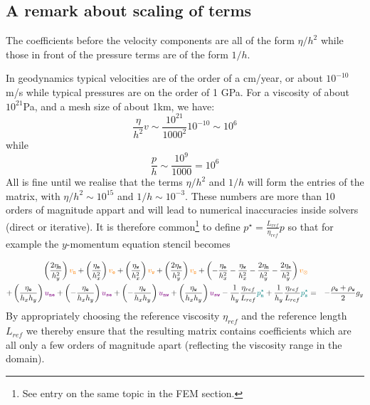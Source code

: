 \subsection{A remark about scaling of terms}

The coefficients before the velocity components are all of the form 
$\eta/h^2$ while those in front of the pressure terms are of the form 
$1/h$. 

In geodynamics typical velocities are of the order of a cm/year, or about 
$10^{-10}$ m/s
while typical pressures are on the order of 1 GPa.
For a viscosity of about $10^{21}$Pa, and a mesh size of about 1km, 
we have:
\[
\frac{\eta}{h^2} v \sim \frac{10^{21}}{1000^2} 10^{-10} \sim 10^6
\]
while
\[
\frac{p}{h} \sim \frac{10^9}{1000} = 10^6
\]
All is fine until we realise that the terms $\eta/h^2$ and $1/h$ 
will form the entries of the matrix, with 
$\eta/h^2 \sim 10^{15}$ and $1/h \sim 10^{-3}$. 
These numbers are more than 10 orders of magnitude appart and will lead to 
numerical inaccuracies inside solvers (direct or iterative). 
It is therefore common\footnote{See entry on the same topic
in the FEM section.} to define ${p}^\star=\frac{L_{ref}}{\eta_{ref}} p$ so that 
for example the $y$-momentum equation stencil becomes


\begin{eqnarray}
\left( \frac{2\eta_{\tt n}}{h_y^2} \right) {\color{orange} v_{\tt n}} +
\left( \frac{ \eta_{\tt e}}{h_x^2} \right) {\color{orange} v_{\tt e}} +
\left( \frac{ \eta_{\tt w}}{h_x^2} \right) {\color{orange} v_{\tt w}} +
\left( \frac{2\eta_{\tt s}}{h_y^2} \right) {\color{orange} v_{\tt s}} +
\left( 
-\frac{\eta_{\tt e}}{h_x^2} 
-\frac{\eta_{\tt w}}{h_x^2} 
-\frac{2\eta_{\tt n}}{h_y^2} 
-\frac{2\eta_{\tt s}}{h_y^2} 
\right) {\color{orange} v_\otimes} \nonumber\\
+
\left( \frac{\eta_{\tt e}}{h_x h_y} \right) {\color{violet} u_{\tt ne}} +
\left(-\frac{\eta_{\tt e}}{h_x h_y} \right) {\color{violet} u_{\tt se}} +
\left(-\frac{\eta_{\tt w}}{h_x h_y} \right) {\color{violet} u_{\tt nw}} +
\left( \frac{\eta_{\tt w}}{h_x h_y} \right) {\color{violet} u_{\tt sw}} 
-\frac{1}{h_y}\frac{\eta_{ref}}{L_{ref}} {\color{teal} {p}_{\tt n}^\star} 
+\frac{1}{h_y}\frac{\eta_{ref}}{L_{ref}} {\color{teal} {p}_{\tt s}^\star}
&=& -\frac{\rho_{\tt e}+\rho_{\tt w}}{2} g_y \nonumber
\end{eqnarray}
By appropriately choosing the reference viscosity $\eta_{ref}$ and the reference
length $L_{ref}$ we thereby ensure that the 
resulting matrix contains coefficients which are all only a 
few orders of magnitude apart (reflecting the viscosity range in the domain).

